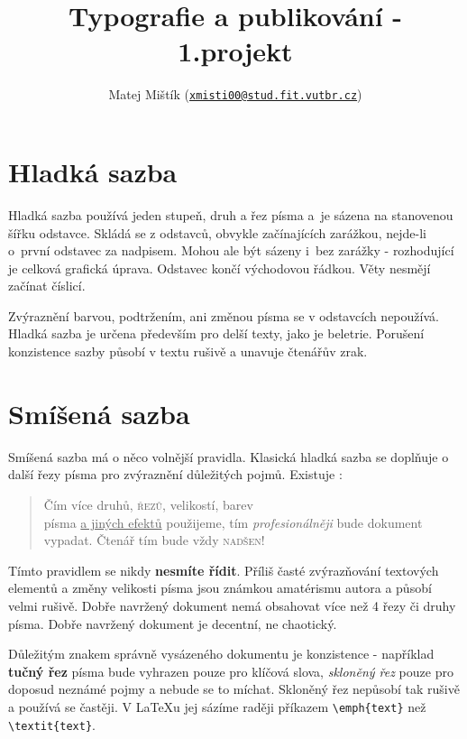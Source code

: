 \documentclass[a4 paper,10pt]{article}
\title{Typografie a publikování - 1.projekt \\[2mm]}
\author{Matej Mištík 
 (\href{mailto:xmisti00@stud.fit.vutbr.cz}{\texttt{xmisti00@stud.fit.vutbr.cz}})}
\date{}
\begin{document}
\maketitle


\section{Hladká sazba}


Hladká sazba používá jeden stupeň, druh a řez písma  a~je sázena na stanovenou šířku odstavce. Skládá  se  z odstavců, obvykle začínajících zarážkou, nejde-li o~první odstavec za nadpisem. Mohou ale být sázeny i~bez zarážky - rozhodující je celková grafická úprava. Odstavec končí východovou řádkou. Věty nesmějí začínat číslicí.

Zvýraznění barvou, podtržením, ani změnou písma se v odstavcích nepoužívá. Hladká sazba je určena především pro delší texty, jako je beletrie. Porušení konzistence sazby působí v textu rušivě a unavuje čtenářův zrak.

\section{Smíšená sazba}

Smíšená sazba má o něco volnější pravidla. Klasická hladká sazba se doplňuje o další řezy písma pro zvýraznění důležitých pojmů. Existuje :

\begin{quote}
    {\selectfont Čím více druhů}, {\textsc{řezů}}, {\tiny velikostí}, barev \\  písma {\underline {a jiných efektů}} použijeme, tím {\Large{\emph {profesionálněji}}} bude dokument vypadat. Čtenář tím bude vždy {\textsc {nadšen!}}\\
\end{quote}


{ \scriptsize Tímto } pravidlem se nikdy {\textbf{nesmíte řídit}}. Příliš časté { \large zvýrazňování } textových elementů a změny velikosti {\huge {písma}} jsou známkou amatérismu autora a působí {\Huge {velmi}} rušivě. Dobře navržený dokument nemá obsahovat více než
4 řezy či druhy písma. Dobře navržený dokument je decentní, ne chaotický.

Důležitým znakem správně vysázeného dokumentu je konzistence - například {\textbf{tučný řez}} písma bude vyhrazen pouze pro klíčová slova, {\textsl{skloněný řez}} pouze pro doposud neznámé pojmy a nebude se to míchat. Skloněný řez nepůsobí tak rušivě a používá se častěji. V \LaTeX u jej sázíme raději příkazem \verb|\emph{text}| než \verb|\textit{text}|.
\end{document}
